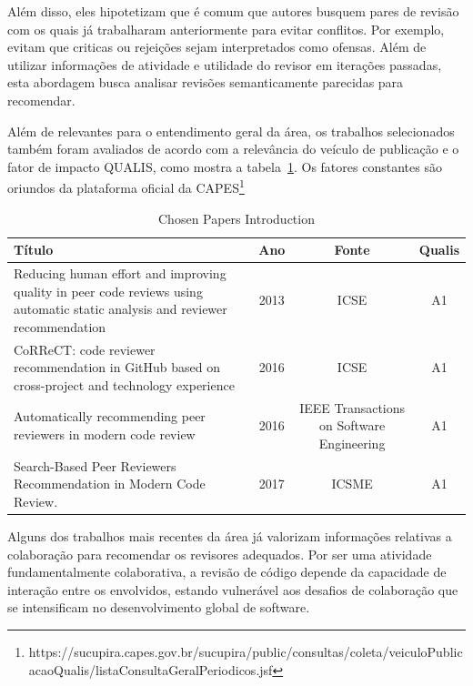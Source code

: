\documentclass[a4paper,12pt]{monografia}
\theoremstyle{plain}
\theoremstyle{definition}
\theoremstyle{remark}
\begin{document}
Além disso, eles hipotetizam que é comum que autores busquem pares de revisão com os quais já trabalharam anteriormente para evitar conflitos. Por exemplo, evitam que criticas ou rejeições sejam interpretados como ofensas. Além de utilizar informações de atividade e utilidade do revisor em iterações passadas, esta abordagem busca analisar revisões semanticamente parecidas para recomendar.


Além de relevantes para o entendimento geral da área, os trabalhos selecionados também foram avaliados de acordo com a relevância do veículo de publicação e o fator de impacto QUALIS, como mostra a tabela~\ref{tab:presentation}. Os fatores constantes são oriundos da plataforma oficial da CAPES\footnote{https://sucupira.capes.gov.br/sucupira/public/consultas/coleta/veiculoPublicacaoQualis/listaConsultaGeralPeriodicos.jsf}


\begin{table}[!h]
\centering
\begin{tabularx}{\columnwidth}{|X|c|c|c|}
\toprule
\hline
Título                                                                                                                        & Ano & Fonte                               & Qualis &  \\
\hline
Reducing human effort and improving quality in peer code reviews using automatic static analysis and reviewer recommendation & 2013 & ICSE                                      & A1            &  \\
CoRReCT: code reviewer recommendation in GitHub based on cross-project and technology experience                             & 2016 & ICSE                                      & A1            &  \\
Automatically recommending peer reviewers in modern code review                                                              & 2016 & IEEE Transactions on Software Engineering & A1            &  \\
Search-Based Peer Reviewers Recommendation in Modern Code Review.                                                            & 2017 & ICSME                                  & A1            &  \\ \bottomrule
\hline

\end{tabularx}%
\caption{Chosen Papers Introduction}
\label{tab:presentation}
\end{table}

Alguns dos trabalhos mais recentes da área já valorizam informações relativas a colaboração para recomendar os revisores adequados\cite{ouni2016, zanjani2016}. Por ser uma atividade fundamentalmente colaborativa, a revisão de código depende da capacidade de interação entre os envolvidos, estando vulnerável aos desafios de colaboração que se intensificam no desenvolvimento global de software.
\end{document}
